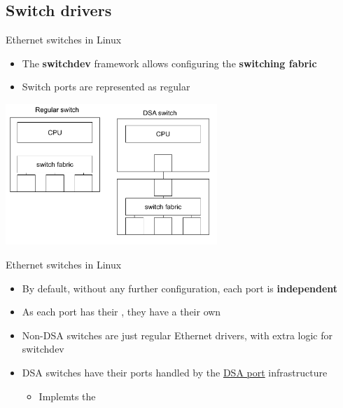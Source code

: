 \subsection{Switch drivers}

\begin{frame}{Ethernet switches in Linux}
	\begin{itemize}
		\item The \textbf{switchdev} framework allows configuring the \textbf{switching fabric}
		\item Switch ports are represented as regular 
	\end{itemize}
	\begin{center}
		\includegraphics[width=0.6\textwidth]{slides/networking-driver-switch/switches.pdf}
	\end{center}
\end{frame}

\begin{frame}{Ethernet switches in Linux}
	\begin{itemize}
		\item By default, without any further configuration, each port is \textbf{independent}
		\item As each port has their , they have a their own 
		\item Non-DSA switches are just regular Ethernet drivers, with extra logic for switchdev
		\item DSA switches have their ports handled by the \href{https://elixir.bootlin.com/linux/v6.15.2/source/net/dsa/port.c}{DSA port} infrastructure
			\begin{itemize}
				\item Implemts the 
			\end{itemize}
	\end{itemize}
\end{frame}


